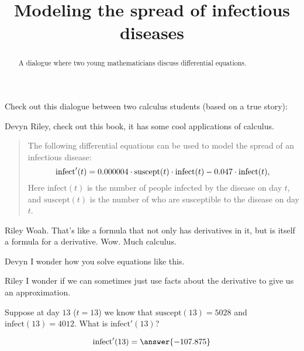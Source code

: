 \documentclass{ximera}
\title[Break-Ground:]{Modeling the spread of infectious diseases}
\begin{document}
\begin{abstract}
  A dialogue where two young mathematicians discuss differential equations.
\end{abstract}
\maketitle







Check out this dialogue between two calculus students (based on a true
story):

\begin{dialogue}
\item[Devyn] Riley, check out this book, it has some cool applications
  of calculus.
\begin{quote}
  The following differential equations can be used to model the spread
  of an infectious disease:
  \[
  \mathrm{infect}'(t) = 0.000004 \cdot \mathrm{suscept}(t) \cdot \mathrm{infect}(t) - 0.047\cdot \mathrm{infect}(t),\\
  \]
  Here $\mathrm{infect}(t)$ is the number of people infected by the
  disease on day $t$, and $\mathrm{suscept}(t)$ is the number of
  who are susceptible to the disease on day $t$.
\end{quote}
\item[Riley] Woah. That's like a formula that not only has derivatives
  in it, but is itself a formula for a derivative. Wow. Much calculus. 
\item[Devyn] I wonder how you solve equations like this.
\item[Riley] I wonder if we can sometimes just use facts about the
  derivative to give us an approximation.
\end{dialogue}

\begin{problem}
  Suppose at day $13$ ($t=13$) we know that $\mathrm{suscept}(13) =
  5028$ and $\mathrm{infect}(13) = 4012$. What is $\mathrm{infect}'(13)$?
  \begin{prompt}
    \[
    \mathrm{infect}'(13) = \answer{-107.875}
    \]
  \end{prompt}
\end{problem}
\end{document}
